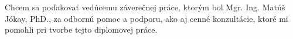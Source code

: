 Chcem sa poďakovať vedúcemu záverečnej práce, ktorým bol Mgr. Ing. Matúš Jókay, PhD., za odbornú pomoc a podporu, ako aj cenné konzultácie, ktoré mi pomohli pri tvorbe tejto diplomovej práce.